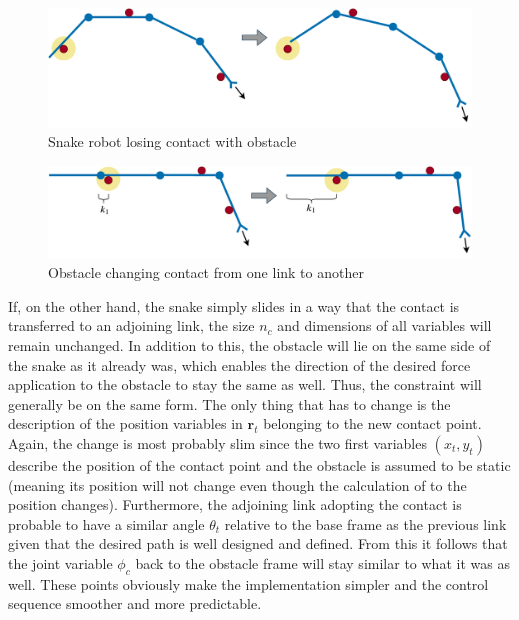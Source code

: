 \begin{figure}
    \centering
    \includegraphics[width=\textwidth]{figures/theory/obst_slide_sequence1.pdf}
    \caption{Snake robot losing contact with obstacle}
    \label{fig:obst_slide_seq1}
\end{figure}

\begin{figure}
    \centering
    \includegraphics[width=\textwidth]{figures/theory/obst_slide_sequence2.pdf}
    \caption{Obstacle changing contact from one link to another}
    \label{fig:obst_slide_seq2}
\end{figure}

If, on the other hand, the snake simply slides in a way that the contact is transferred to an adjoining link, the size $n_c$ and dimensions of all variables will remain unchanged. In addition to this, the obstacle will lie on the same side of the snake as it already was, which enables the direction of the desired force application to the obstacle to stay the same as well. Thus, the constraint will generally be on the same form. The only thing that has to change is the description of the position variables in $\mathbf{r}_t$ belonging to the new contact point. Again, the change is most probably slim since the two first variables $(x_t, y_t)$ describe the position of the contact point and the obstacle is assumed to be static (meaning its position will not change even though the calculation of to the position changes). Furthermore, the adjoining link adopting the contact is probable to have a similar angle $\theta_t$ relative to the base frame as the previous link given that the desired path is well designed and defined. From this it follows that the joint variable $\phi_c$ back to the obstacle frame will stay similar to what it was as well. These points obviously make the implementation simpler and the control sequence smoother and more predictable.

